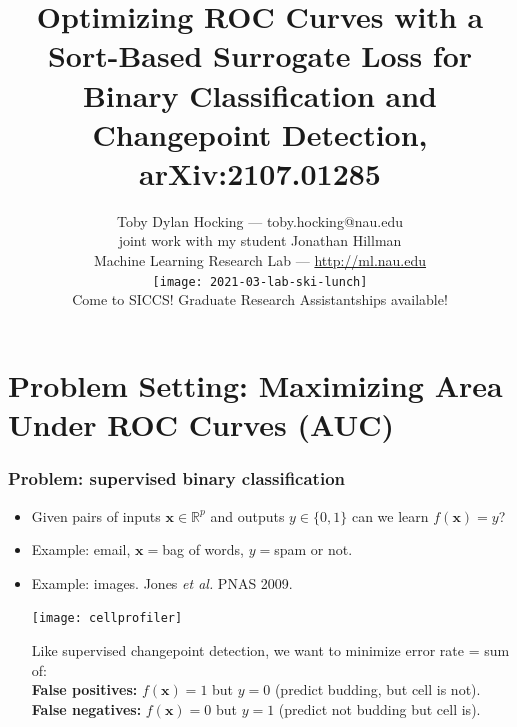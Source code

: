 \documentclass[t]{beamer}
\begin{document}
\title{Optimizing ROC Curves with a Sort-Based Surrogate Loss for Binary Classification and Changepoint Detection, arXiv:2107.01285}

\author{
  Toby Dylan Hocking --- toby.hocking@nau.edu\\ 
  joint work with my student Jonathan Hillman\\
  Machine Learning Research Lab --- \url{http://ml.nau.edu}\\
  \texttt{[image: 2021-03-lab-ski-lunch]} \\
  Come to SICCS! Graduate Research Assistantships available!
}

\date{}

\maketitle

\section{Problem Setting: Maximizing Area Under ROC Curves (AUC)}

\begin{frame}
  \frametitle{Problem: supervised binary classification}
  
  \begin{itemize}
  \item Given pairs of inputs $\mathbf x\in\mathbb R^p$ and outputs
    $y\in\{0,1\}$ can we learn $f(\mathbf x)= y$?
  \item Example: email, $\mathbf x =$bag of words, $y=$spam or not.
  \item Example: images. Jones {\it et al.} PNAS 2009.
    \parbox{2in}{\texttt{[image: cellprofiler]}}
    \parbox{1.9in}{Like supervised changepoint detection, we want to
      minimize error rate = sum of:\\
      \textbf{False positives:} $f(\mathbf x)=1$ but $y=0$ (predict
        budding, but cell is not).\\
      \textbf{False negatives:} $f(\mathbf x)=0$ but $y=1$ (predict not
        budding but cell is).
    }
  \end{itemize} 
\end{frame}
\end{document}
